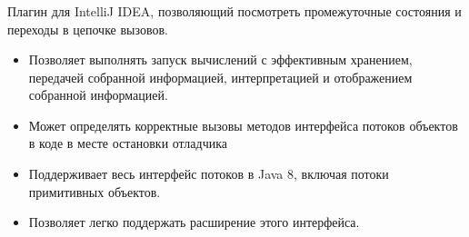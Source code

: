 \begin{frame}
\frametitle{\insertsection} 
\framesubtitle{\insertsubsection}
Плагин для IntelliJ IDEA, позволяющий посмотреть промежуточные состояния и переходы в цепочке вызовов. 
\begin{itemize}
	\item Позволяет выполнять запуск вычислений с эффективным хранением, передачей собранной информацией, интерпретацией и отображением собранной информацией.
	\item Может определять корректные вызовы методов интерфейса потоков объектов в коде в месте остановки отладчика
	\item Поддерживает весь интерфейс потоков в Java 8, включая потоки примитивных объектов.
	\item Позволяет легко поддержать расширение этого интерфейса.
\end{itemize}
\end{frame}
 